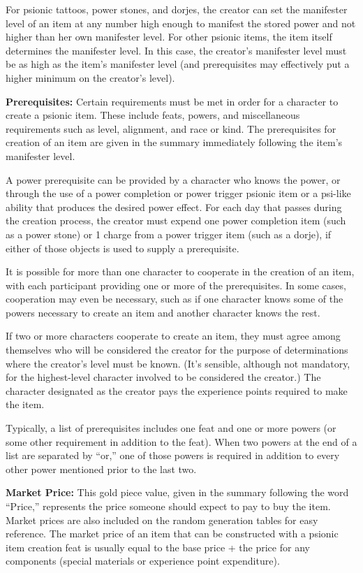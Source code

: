 \documentclass{article}
\begin{document}
For psionic tattoos, power stones, and dorjes, the creator can set the manifester 
level of an item at any number high enough to manifest the stored power and not 
higher than her own manifester level. For other psionic items, the item itself 
determines the manifester level. In this case, the creator's manifester level must 
be as high as the item's manifester level (and prerequisites may effectively put 
a higher minimum on the creator's level).

\textbf{Prerequisites:} Certain requirements must be met in order for a character 
to create a psionic item. These include feats, powers, and miscellaneous requirements 
such as level, alignment, and race or kind. The prerequisites for creation of an 
item are given in the summary immediately following the item's manifester level.

A power prerequisite can be provided by a character who knows the power, or through 
the use of a power completion or power trigger psionic item or a psi-like ability 
that produces the desired power effect. For each day that passes during the creation 
process, the creator must expend one power completion item (such as a power stone) 
or 1 charge from a power trigger item (such as a dorje), if either of those objects 
is used to supply a prerequisite.

It is possible for more than one character to cooperate in the creation of an item, 
with each participant providing one or more of the prerequisites. In some cases, 
cooperation may even be necessary, such as if one character knows some of the powers 
necessary to create an item and another character knows the rest.

If two or more characters cooperate to create an item, they must agree among themselves 
who will be considered the creator for the purpose of determinations where the 
creator's level must be known. (It's sensible, although not mandatory, for the 
highest-level character involved to be considered the creator.) The character designated 
as the creator pays the experience points required to make the item.

Typically, a list of prerequisites includes one feat and one or more powers (or 
some other requirement in addition to the feat). When two powers at the end of 
a list are separated by ``or,'' one of those powers is required in addition to 
every other power mentioned prior to the last two.

\textbf{Market Price:} This gold piece value, given in the summary following the 
word ``Price,'' represents the price someone should expect to pay to buy the item. 
Market prices are also included on the random generation tables for easy reference. 
The market price of an item that can be constructed with a psionic item creation 
feat is usually equal to the base price + the price for any components (special 
materials or experience point expenditure).
\end{document}
